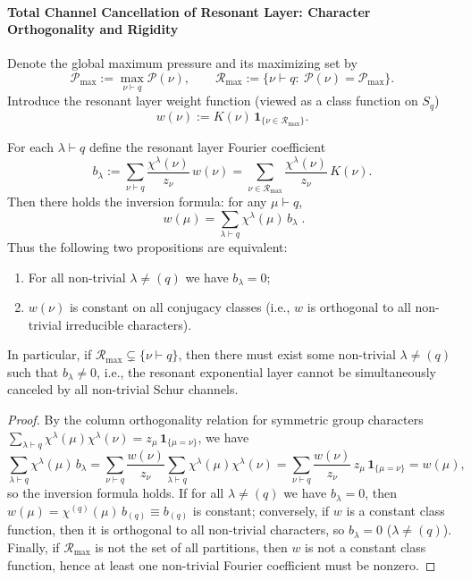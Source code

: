 \paragraph{Total Channel Cancellation of Resonant Layer: Character Orthogonality and Rigidity}
Denote the global maximum pressure and its maximizing set by
\[
\mathcal{P}_{\max}:=\max_{\nu\vdash q}\mathcal{P}(\nu),
\qquad
\mathcal{R}_{\max}:=\{\nu\vdash q:\ \mathcal{P}(\nu)=\mathcal{P}_{\max}\}.
\]
Introduce the resonant layer weight function (viewed as a class function on \(S_q\))
\[
w(\nu):=K(\nu)\,\mathbf 1_{\{\nu\in\mathcal{R}_{\max}\}}.
\]

\begin{proposition}\label{prop:pom-schur-resonant-layer-total-cancellation}
For each \(\lambda\vdash q\) define the resonant layer Fourier coefficient
\[
b_\lambda:=\sum_{\nu\vdash q}\frac{\chi^\lambda(\nu)}{z_\nu}\,w(\nu)
=\sum_{\nu\in\mathcal{R}_{\max}}\frac{\chi^\lambda(\nu)}{z_\nu}\,K(\nu).
\]
Then there holds the inversion formula: for any \(\mu\vdash q\),
\[
\boxed{\;
w(\mu)=\sum_{\lambda\vdash q}\chi^\lambda(\mu)\,b_\lambda\; }.
\]
Thus the following two propositions are equivalent:
\begin{enumerate}
  \item For all non-trivial \(\lambda\neq(q)\) we have \(b_\lambda=0\);
  \item \(w(\nu)\) is constant on all conjugacy classes (i.e., \(w\) is orthogonal to all non-trivial irreducible characters).
\end{enumerate}
In particular, if \(\mathcal{R}_{\max}\subsetneq\{\nu\vdash q\}\), then there must exist some non-trivial \(\lambda\neq(q)\) such that \(b_\lambda\neq 0\), i.e., the resonant exponential layer cannot be simultaneously canceled by all non-trivial Schur channels.
\end{proposition}
\begin{proof}
By the column orthogonality relation for symmetric group characters
\(
\sum_{\lambda\vdash q}\chi^\lambda(\mu)\chi^\lambda(\nu)=z_\mu\,\mathbf 1_{\{\mu=\nu\}}
\),
we have
\[
\sum_{\lambda\vdash q}\chi^\lambda(\mu)\,b_\lambda
=\sum_{\nu\vdash q}\frac{w(\nu)}{z_\nu}\sum_{\lambda\vdash q}\chi^\lambda(\mu)\chi^\lambda(\nu)
=\sum_{\nu\vdash q}\frac{w(\nu)}{z_\nu}\,z_\mu\,\mathbf 1_{\{\mu=\nu\}}
=w(\mu),
\]
so the inversion formula holds.
If for all \(\lambda\neq(q)\) we have \(b_\lambda=0\), then \(w(\mu)=\chi^{(q)}(\mu)\,b_{(q)}\equiv b_{(q)}\) is constant;
conversely, if \(w\) is a constant class function, then it is orthogonal to all non-trivial characters, so \(b_\lambda=0\) (\(\lambda\neq(q)\)).
Finally, if \(\mathcal{R}_{\max}\) is not the set of all partitions, then \(w\) is not a constant class function, hence at least one non-trivial Fourier coefficient must be nonzero.
\end{proof}

